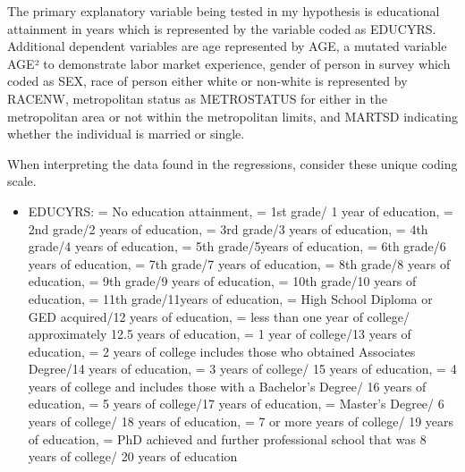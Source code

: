 \documentclass[12pt, English]{article}
\begin{document}
The primary explanatory variable being tested in my hypothesis is educational attainment in years which is represented by the variable coded as EDUCYRS. Additional dependent variables are age represented by AGE, a mutated variable AGE² to demonstrate labor market experience, gender of person in survey which coded as SEX, race of person either white or non-white is represented by RACENW, metropolitan status as METROSTATUS for either in the metropolitan area or not within the metropolitan limits, and MARTSD indicating whether the individual is married or single. 

When interpreting the data found in the regressions, consider these unique coding scale. 
\begin{itemize}
\item EDUCYRS:  = No education attainment,  = 1st grade/ 1 year of education, = 2nd grade/2 years of education,  = 3rd grade/3 years of education,  = 4th grade/4 years of education,  = 5th grade/5years of education,  = 6th grade/6 years of education,  = 7th grade/7 years of education,   = 8th grade/8 years of education, = 9th grade/9 years of education,  = 10th grade/10 years of education,  = 11th grade/11years of education,  = High School Diploma or GED acquired/12 years of education, = less than one year of college/ approximately 12.5 years of education,  = 1 year of college/13 years of education,  = 2 years of college includes those who obtained Associates Degree/14 years of education,  = 3 years of college/ 15 years of education, = 4 years of college and includes those with a Bachelor’s Degree/ 16 years of education,  = 5 years of college/17 years of education,  = Master’s Degree/ 6 years of college/ 18 years of education, = 7 or more years of college/ 19 years of education,  = PhD achieved and further professional school that was 8 years of college/ 20 years of education \newline


\end{itemize}
\end{document}
